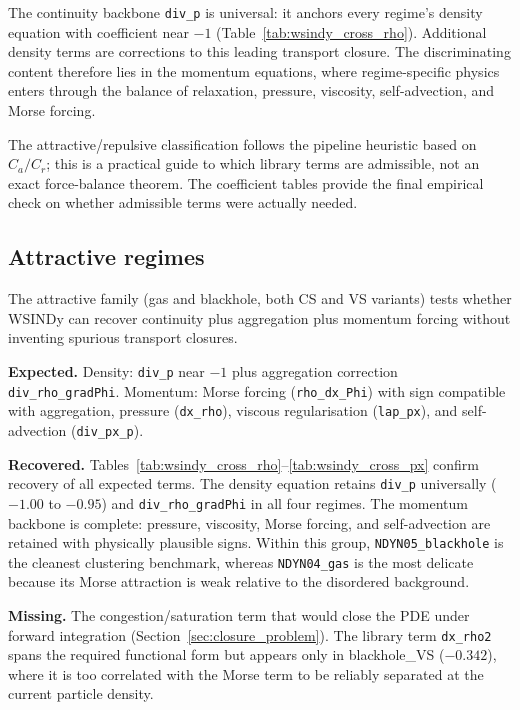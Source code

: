 The continuity backbone \texttt{div\_p} is universal: it anchors every
regime's density equation with coefficient near $-1$
(Table~\ref{tab:wsindy_cross_rho}).  Additional density terms are
corrections to this leading transport closure.  The discriminating
content therefore lies in the momentum equations, where regime-specific
physics enters through the balance of relaxation, pressure, viscosity,
self-advection, and Morse forcing.

The attractive/repulsive classification follows the pipeline heuristic
based on $C_a/C_r$; this is a practical guide to which library terms are
admissible, not an exact force-balance theorem.  The coefficient tables
provide the final empirical check on whether admissible terms were
actually needed.

\subsection{Attractive regimes}
\label{subsec:interp_attractive}

The attractive family (gas and blackhole, both CS and VS variants)
tests whether
WSINDy can recover continuity plus aggregation plus momentum forcing
without inventing spurious transport closures.

\noindent\textbf{Expected.}
Density: \texttt{div\_p} near $-1$ plus aggregation correction
\texttt{div\_rho\_gradPhi}.
Momentum: Morse forcing (\texttt{rho\_dx\_Phi}) with sign compatible with
aggregation, pressure (\texttt{dx\_rho}), viscous regularisation
(\texttt{lap\_px}), and self-advection (\texttt{div\_px\_p}).

\noindent\textbf{Recovered.}
Tables~\ref{tab:wsindy_cross_rho}--\ref{tab:wsindy_cross_px} confirm
recovery of all expected terms.  The density equation retains
\texttt{div\_p} universally ($-1.00$ to $-0.95$) and
\texttt{div\_rho\_gradPhi} in all four regimes.  The momentum backbone is
complete: pressure, viscosity, Morse forcing, and self-advection are
retained with physically plausible signs.  Within this group,
\texttt{NDYN05\_blackhole} is the cleanest clustering benchmark, whereas
\texttt{NDYN04\_gas} is the most delicate because its Morse attraction is
weak relative to the disordered background.

\noindent\textbf{Missing.}
The congestion/saturation term that would close the PDE under forward
integration (Section~\ref{sec:closure_problem}).  The library term
\texttt{dx\_rho2} spans the required functional form but appears only in
blackhole\_VS ($-0.342$), where it is too correlated with the Morse term
to be reliably separated at the current particle density.

